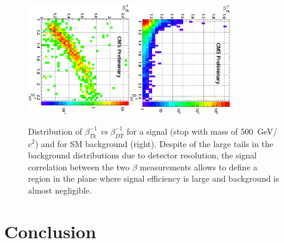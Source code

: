 \documentclass{cimento}
\begin{document}
\begin{figure}[htbp] 
\centering
\includegraphics[angle=90,width=0.4\textwidth]{betaHSCPSig.eps}\includegraphics[angle=90,width=0.4\textwidth]{betaHSCPBkg.eps}  
\caption{Distribution of $\beta_{Tk}^{-1}$ {\it vs} $\beta_{DT}^{-1}$ for
a signal (stop with mass of 500~GeV/$c^2$) and for SM background (right). 
Despite of the large tails in the background distributions due 
to detector resolution, the signal correlation between the two $\beta$ measurements 
allows to define a region in the plane where signal efficiency is large and 
background is almost negligible.}
\label{fig:HSCPSigBkgPlots}
\end{figure}

\section{Conclusion} \label{Conclusion}








\end{document}
